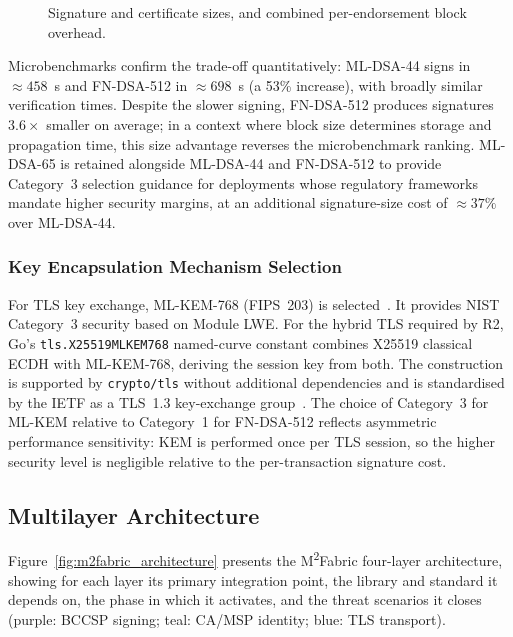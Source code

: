 \documentclass{ieeetj}
\newcommand{\mfabric}{M\textsuperscript{2}Fabric}
\begin{document}
\begin{figure}[ht]
\centering

\caption{Signature and certificate sizes, and combined per-endorsement block overhead.}
\label{fig:sig_cert_sizes}
\end{figure}

Microbenchmarks confirm the trade-off quantitatively: ML-DSA-44 signs in
$\approx458$~\textmu s and FN-DSA-512 in $\approx698$~\textmu s (a 53\%
increase), with broadly similar verification times. Despite the slower signing,
FN-DSA-512 produces signatures $3.6\times$ smaller on average; in a context
where block size determines storage and propagation time, this size advantage
reverses the microbenchmark ranking. ML-DSA-65 is retained alongside ML-DSA-44
and FN-DSA-512 to provide Category~3 selection guidance for deployments whose
regulatory frameworks mandate higher security margins, at an additional
signature-size cost of $\approx37\%$ over ML-DSA-44.

\subsubsection{Key Encapsulation Mechanism Selection}

For TLS key exchange, ML-KEM-768 (FIPS~203) is selected~\cite{nist_fips203}. It
provides NIST Category~3 security based on Module LWE. For the hybrid TLS
required by R2, Go's \texttt{tls.X25519MLKEM768} named-curve constant combines
X25519 classical ECDH with ML-KEM-768, deriving the session key from both. The
construction is supported by \texttt{crypto/tls} without additional
dependencies and is standardised by the IETF as a TLS~1.3 key-exchange
group~\cite{ietf_hybrid_tls}. The choice of Category~3 for ML-KEM relative to
Category~1 for FN-DSA-512 reflects asymmetric performance sensitivity: KEM is
performed once per TLS session, so the higher security level is negligible
relative to the per-transaction signature cost.

\subsection{Multilayer Architecture}
\label{sec:method_arch}

Figure~\ref{fig:m2fabric_architecture} presents the \mfabric{} four-layer
architecture, showing for each layer its primary integration point, the library
and standard it depends on, the phase in which it activates, and the threat
scenarios it closes (purple: BCCSP signing; teal: CA/MSP identity; blue: TLS
transport).
\end{document}
